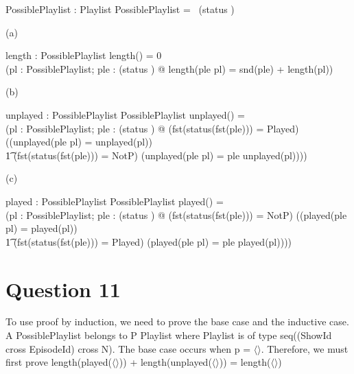 \documentclass[a4paper,10pt,fleqn]{article}
\begin{document}
\begin{axdef}
PossiblePlaylist : \power Playlist
\where
PossiblePlaylist = \seq~(\dom status \cross \nat)
\end{axdef}

\noindent\hspace*{\parindent}(a) \begin{axdef}
length : PossiblePlaylist \fun \nat
\where
length(\langle \rangle) = 0 \land \\
\quad (\forall pl : PossiblePlaylist; ple : (\dom status \cross \nat) @ length(\langle ple \rangle \cat pl) = snd(ple) + length(pl))
\end{axdef}

\medskip

\noindent\hspace*{\parindent}(b) \begin{axdef}
unplayed : PossiblePlaylist \fun PossiblePlaylist
\where
unplayed(\langle \rangle) = \langle \rangle \land \\
\quad (\forall pl : PossiblePlaylist; ple : (\dom status \cross \nat) @ (fst(status(fst(ple))) = Played) \implies ((unplayed(\langle ple \rangle \cat pl) = unplayed(pl)) \land \\
\t1 (fst(status(fst(ple))) = NotP) \implies (unplayed(\langle ple \rangle \cat pl) = \langle ple \rangle \cat unplayed(pl))))
\end{axdef}

\medskip

\noindent\hspace*{\parindent}(c) \begin{axdef}
played : PossiblePlaylist \fun PossiblePlaylist
\where
played(\langle \rangle) = \langle \rangle \land \\
\quad (\forall pl : PossiblePlaylist; ple : (\dom status \cross \nat) @ (fst(status(fst(ple))) = NotP) \implies ((played(\langle ple \rangle \cat pl) = played(pl)) \land \\
\t1 (fst(status(fst(ple))) = Played) \implies (played(\langle ple \rangle \cat pl) = \langle ple \rangle \cat played(pl))))
\end{axdef}

\section*{Question 11}

\noindent To use proof by induction, we need to prove the base case and the inductive case.  A PossiblePlaylist belongs to P Playlist where Playlist is of type seq((ShowId cross EpisodeId) cross N). The base case occurs when p = $\langle \rangle$. Therefore, we must first prove length(played($\langle \rangle$)) + length(unplayed($\langle \rangle$)) = length($\langle \rangle$)
\end{document}

